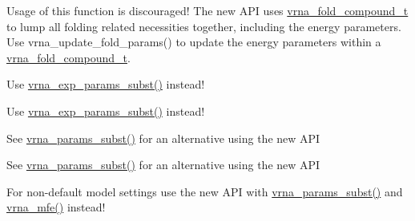 \begin{DoxyRefList}
\item[\label{deprecated__deprecated000025}%
\hypertarget{deprecated__deprecated000025}{}%
global\+Scope$>$ Global \hyperlink{group__consensus__fold_gac484c6bd429bafbd353b91044508d8e9}{update\+\_\+alifold\+\_\+params} (void)]Usage of this function is discouraged! The new A\+P\+I uses \hyperlink{group__fold__compound_ga1b0cef17fd40466cef5968eaeeff6166}{vrna\+\_\+fold\+\_\+compound\+\_\+t} to lump all folding related necessities together, including the energy parameters. Use vrna\+\_\+update\+\_\+fold\+\_\+params() to update the energy parameters within a \hyperlink{group__fold__compound_ga1b0cef17fd40466cef5968eaeeff6166}{vrna\+\_\+fold\+\_\+compound\+\_\+t}.  
\item[\label{deprecated__deprecated000117}%
\hypertarget{deprecated__deprecated000117}{}%
global\+Scope$>$ Global \hyperlink{part__func__co_8h_a6e0f36c1f9b7d9dd4bfbad914c1119e5}{update\+\_\+co\+\_\+pf\+\_\+params} (int length)]Use \hyperlink{group__energy__parameters_ga8e7ac4fab3b0cc03afbc134eaafb3525}{vrna\+\_\+exp\+\_\+params\+\_\+subst()} instead! 
\item[\label{deprecated__deprecated000118}%
\hypertarget{deprecated__deprecated000118}{}%
global\+Scope$>$ Global \hyperlink{part__func__co_8h_a75465d7e8793db68a434d83df9a2e794}{update\+\_\+co\+\_\+pf\+\_\+params\+\_\+par} (int length, vrna\+\_\+exp\+\_\+param\+\_\+t $\ast$parameters)]Use \hyperlink{group__energy__parameters_ga8e7ac4fab3b0cc03afbc134eaafb3525}{vrna\+\_\+exp\+\_\+params\+\_\+subst()} instead! 
\item[\label{deprecated__deprecated000033}%
\hypertarget{deprecated__deprecated000033}{}%
global\+Scope$>$ Global \hyperlink{group__mfe__cofold_ga4fcbf34e77b99bfbb2333d2ab0c41a57}{update\+\_\+cofold\+\_\+params} (void)]See \hyperlink{group__energy__parameters_ga5d1909208f7ea3baa98b75afaa1f62ca}{vrna\+\_\+params\+\_\+subst()} for an alternative using the new A\+P\+I  
\item[\label{deprecated__deprecated000034}%
\hypertarget{deprecated__deprecated000034}{}%
global\+Scope$>$ Global \hyperlink{group__mfe__cofold_gaaadbd28b4e428710529ab4098fdacad3}{update\+\_\+cofold\+\_\+params\+\_\+par} (vrna\+\_\+param\+\_\+t $\ast$parameters)]See \hyperlink{group__energy__parameters_ga5d1909208f7ea3baa98b75afaa1f62ca}{vrna\+\_\+params\+\_\+subst()} for an alternative using the new A\+P\+I  
\item[\label{deprecated__deprecated000067}%
\hypertarget{deprecated__deprecated000067}{}%
global\+Scope$>$ Global \hyperlink{group__mfe__fold__single_ga41bf8f6fa15b94471f7095cad9f0ccf3}{update\+\_\+fold\+\_\+params} (void)]For non-\/default model settings use the new A\+P\+I with \hyperlink{group__energy__parameters_ga5d1909208f7ea3baa98b75afaa1f62ca}{vrna\+\_\+params\+\_\+subst()} and \hyperlink{group__mfe__fold_gabd3b147371ccf25c577f88bbbaf159fd}{vrna\+\_\+mfe()} instead! 

\end{DoxyRefList}
